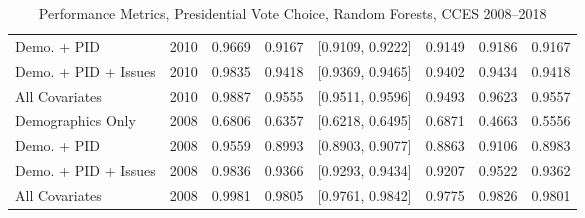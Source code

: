 \begin{table}[ht]
\begin{tabular}{lrrrlrrr}
  Demo. + PID & 2010 & 0.9669 & 0.9167 & [0.9109, 0.9222] & 0.9149 & 0.9186 & 0.9167 \\ 
  Demo. + PID + Issues & 2010 & 0.9835 & 0.9418 & [0.9369, 0.9465] & 0.9402 & 0.9434 & 0.9418 \\ 
  All Covariates & 2010 & 0.9887 & 0.9555 & [0.9511, 0.9596] & 0.9493 & 0.9623 & 0.9557 \\ 
  Demographics Only & 2008 & 0.6806 & 0.6357 & [0.6218, 0.6495] & 0.6871 & 0.4663 & 0.5556 \\ 
  Demo. + PID & 2008 & 0.9559 & 0.8993 & [0.8903, 0.9077] & 0.8863 & 0.9106 & 0.8983 \\ 
  Demo. + PID + Issues & 2008 & 0.9836 & 0.9366 & [0.9293, 0.9434] & 0.9207 & 0.9522 & 0.9362 \\ 
  All Covariates & 2008 & 0.9981 & 0.9805 & [0.9761, 0.9842] & 0.9775 & 0.9826 & 0.9801 \\ 
   \bottomrule
\end{tabular}
\caption{Performance Metrics, Presidential Vote Choice, Random Forests, CCES 2008--2018} 
\label{tab:cces_preschoice_rf}
\end{table}
